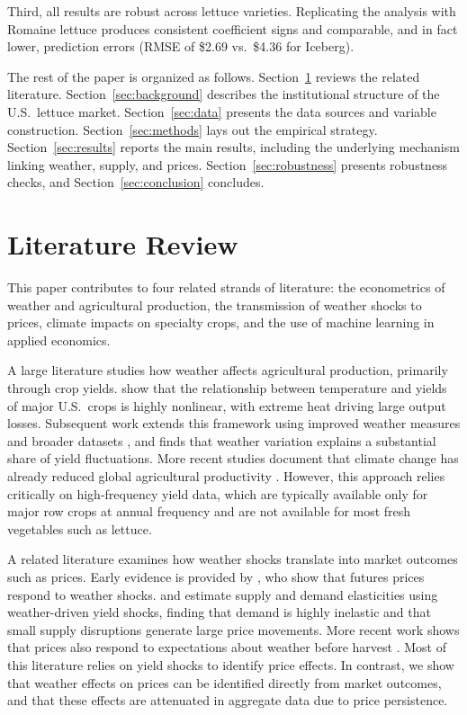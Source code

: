 \documentclass[12pt]{article}
\begin{document}
Third, all results are robust across lettuce varieties. Replicating the analysis with Romaine lettuce produces consistent coefficient signs and comparable, and in fact lower, prediction errors (RMSE of \$2.69 vs.\ \$4.36 for Iceberg).

The rest of the paper is organized as follows. Section~\ref{sec:literature} reviews the related literature. Section~\ref{sec:background} describes the institutional structure of the U.S.\ lettuce market. Section~\ref{sec:data} presents the data sources and variable construction. Section~\ref{sec:methods} lays out the empirical strategy. Section~\ref{sec:results} reports the main results, including the underlying mechanism linking weather, supply, and prices. Section~\ref{sec:robustness} presents robustness checks, and Section~\ref{sec:conclusion} concludes.

\section{Literature Review}
\label{sec:literature}

This paper contributes to four related strands of literature: the econometrics of weather and agricultural production, the transmission of weather shocks to prices, climate impacts on specialty crops, and the use of machine learning in applied economics.

A large literature studies how weather affects agricultural production, primarily through crop yields. \citet{schlenker2009nonlinear} show that the relationship between temperature and yields of major U.S.\ crops is highly nonlinear, with extreme heat driving large output losses. Subsequent work extends this framework using improved weather measures and broader datasets \citep[e.g.,][]{roberts2013agronomic}, and finds that weather variation explains a substantial share of yield fluctuations. More recent studies document that climate change has already reduced global agricultural productivity \citep[e.g.,][]{lobell2011climate, ortiz2021anthropogenic}. However, this approach relies critically on high-frequency yield data, which are typically available only for major row crops at annual frequency and are not available for most fresh vegetables such as lettuce.

A related literature examines how weather shocks translate into market outcomes such as prices. Early evidence is provided by \citet{roll1984orange}, who show that futures prices respond to weather shocks. \citet{roberts2009world} and \citet{roberts2013identifying} estimate supply and demand elasticities using weather-driven yield shocks, finding that demand is highly inelastic and that small supply disruptions generate large price movements. More recent work shows that prices also respond to expectations about weather before harvest \citep{letta2022weather}. Most of this literature relies on yield shocks to identify price effects. In contrast, we show that weather effects on prices can be identified directly from market outcomes, and that these effects are attenuated in aggregate data due to price persistence.
\end{document}
